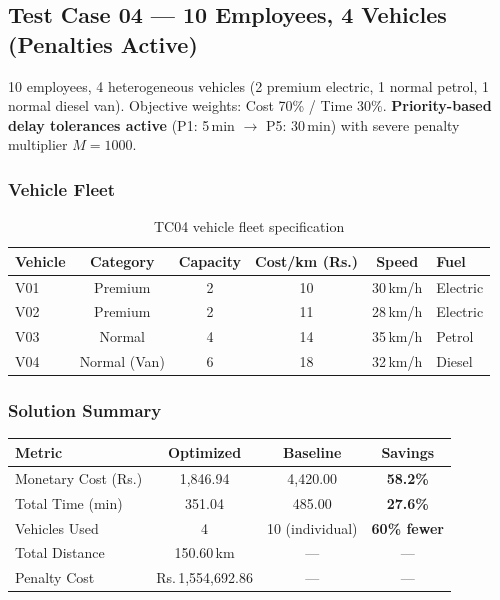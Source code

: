 \documentclass[11pt,a4paper]{article}
\newcommand{\rupee}{Rs.}
\newcommand{\saving}[1]{\textcolor{velgreen}{\textbf{#1}}}
\begin{document}
\subsection{Test Case 04 --- 10 Employees, 4 Vehicles (Penalties Active)}

\begin{instancebox}
10 employees, 4 heterogeneous vehicles (2 premium electric, 1 normal petrol, 1 normal diesel van). Objective weights: Cost 70\% / Time 30\%. \textbf{Priority-based delay tolerances active} (P1: 5\,min $\to$ P5: 30\,min) with severe penalty multiplier $M = 1000$.
\end{instancebox}

\subsubsection{Vehicle Fleet}

\begin{table}[H]
\centering
\begin{tabular}{lccccl}
\toprule
\textbf{Vehicle} & \textbf{Category} & \textbf{Capacity} & \textbf{Cost/km (\rupee)} & \textbf{Speed} & \textbf{Fuel} \\
\midrule
\rowcolor{rowalt}
V01 & Premium & 2 & 10 & 30\,km/h & Electric \\
V02 & Premium & 2 & 11 & 28\,km/h & Electric \\
\rowcolor{rowalt}
V03 & Normal  & 4 & 14 & 35\,km/h & Petrol \\
V04 & Normal (Van) & 6 & 18 & 32\,km/h & Diesel \\
\bottomrule
\end{tabular}
\caption{TC04 vehicle fleet specification}
\label{tab:tc04-fleet}
\end{table}

\subsubsection{Solution Summary}

\begin{table}[H]
\centering
\begin{tabular}{lccc}
\toprule
\textbf{Metric} & \textbf{Optimized} & \textbf{Baseline} & \textbf{Savings} \\
\midrule
\rowcolor{rowalt}
Monetary Cost (\rupee) & 1,846.94 & 4,420.00 & \saving{58.2\%} \\
Total Time (min) & 351.04 & 485.00 & \saving{27.6\%} \\
\rowcolor{rowalt}
Vehicles Used & 4 & 10 (individual) & \saving{60\% fewer} \\
Total Distance & 150.60\,km & --- & --- \\
\rowcolor{rowalt}
Penalty Cost & \rupee\,1,554,692.86 & --- & --- \\
\bottomrule
\end{tabular}
\end{table}
\end{document}
